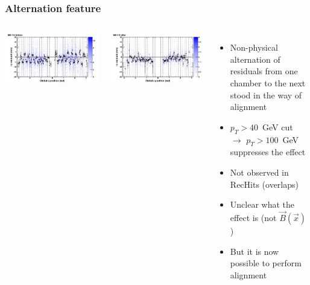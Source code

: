 \documentclass[compress]{beamer}
\begin{document}
\begin{frame}
\frametitle{Alternation feature}
\begin{columns}
\includegraphics[width=\linewidth]{wasitthepropagator_before.png}

\includegraphics[width=\linewidth]{wasitthepropagator_after.png}
\begin{itemize}
\item Non-physical alternation of residuals from one chamber to the next stood in the way of alignment

\item $p_T > 40$~GeV cut $\to$ $p_T > 100$~GeV suppresses the effect

\item Not observed in RecHits (overlaps)

\item Unclear what the effect is (not $\vec{B}(\vec{x})$)

\item But it is now possible to perform alignment
\end{itemize}
\end{columns}
\end{frame}
\end{document}
